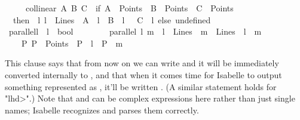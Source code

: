 \begin{isabellebody}
\ \ \ \ \ {\isachardoublequoteopen}collinear\ A\ B\ C\ {\isacharequal}{\kern0pt}\ {\isacharparenleft}{\kern0pt}if\ A\ {\isasymin}\ Points\ {\isasymand}\ B\ {\isasymin}\ Points\ {\isasymand}\ C\ {\isasymin}\ Points\ \isanewline
\ \ then\ {\isacharparenleft}{\kern0pt}{\isasymexists}\ l{\isachardot}{\kern0pt}\ l\ {\isasymin}\ Lines\ {\isasymand}\ A\ {\isasymlhd}\ l\ {\isasymand}\ B\ {\isasymlhd}\ l\ {\isasymand}\ \ C\ {\isasymlhd}\ l{\isacharparenright}{\kern0pt}\ else\ undefined{\isacharparenright}{\kern0pt}{\isachardoublequoteclose}\isanewline
\isanewline
{}\isamarkupfalse%
\ parallel{\isacharcolon}{\kern0pt}{\isacharcolon}{\kern0pt}{\isachardoublequoteopen}{\isacharprime}{\kern0pt}l\ {\isasymRightarrow}\ {\isacharprime}{\kern0pt}l\ {\isasymRightarrow}\ bool{\isachardoublequoteclose}\ \ {\isacharparenleft}{\kern0pt}\ {\isachardoublequoteopen}{\isacharbar}{\kern0pt}{\isacharbar}{\kern0pt}{\isachardoublequoteclose}\ {}{}{\isacharparenright}{\kern0pt}\ \ \isanewline
\ \ {\isachardoublequoteopen}parallel\ l\ m\ {\isacharequal}{\kern0pt}\ {\isacharparenleft}{\kern0pt}{\isacharparenleft}{\kern0pt}l\ {\isasymin}\ Lines{\isacharparenright}{\kern0pt}\ {\isasymand}\ {\isacharparenleft}{\kern0pt}m\ {\isasymin}\ Lines{\isacharparenright}{\kern0pt}\ {\isasymand}\ {\isacharparenleft}{\kern0pt}{\isacharparenleft}{\kern0pt}l\ {\isacharequal}{\kern0pt}\ m{\isacharparenright}{\kern0pt}\ {\isasymor}\ \ \isanewline
\ \ {\isacharparenleft}{\kern0pt}{\isacharparenleft}{\kern0pt}{\isasymnot}\ {\isacharparenleft}{\kern0pt}{\isasymexists}\ P{\isachardot}{\kern0pt}\ P\ {\isasymin}\ Points\ {\isasymand}\ P\ {\isasymlhd}\ l\ {\isasymand}\ P\ {\isasymlhd}\ m{\isacharparenright}{\kern0pt}{\isacharparenright}{\kern0pt}{\isacharparenright}{\kern0pt}{\isacharparenright}{\kern0pt}{\isacharparenright}{\kern0pt}{\isachardoublequoteclose}%
\begin{isamarkuptext}%
This  clause says that from now on we 
can write  and it will be immediately converted internally to , and 
that when it comes time for Isabelle to output something represented as 
, it'll be written . (A similar statement holds for "\<lhd>".)
Note that  and  can be complex expressions here rather than just single names; Isabelle 
recognizes and parses them correctly. 
\done%
\end{isamarkuptext}\isamarkuptrue%
%
\begin{isamarkuptext}%

\end{isamarkuptext}
\end{isabellebody}

